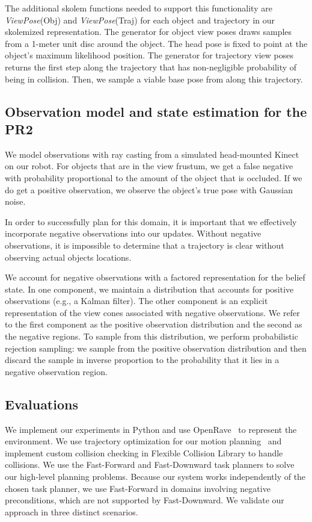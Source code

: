The additional skolem functions needed to support this functionality
are \emph{ViewPose}(Obj) and \emph{ViewPose}(Traj) for each object and
trajectory in our skolemized representation. The generator for object
view poses draws samples from a 1-meter unit disc around the
object. The head pose is fixed to point at the object's maximum
likelihood position. The generator for trajectory view poses returns
the first step along the trajectory that has non-negligible probability of being
in collision. Then, we sample a viable base pose from along this trajectory.

\subsection{Observation model and state estimation for the PR2}
We model observations with ray casting from a simulated head-mounted
Kinect on our robot. For objects that are in the view
frustum, we get a false negative with probability proportional to the
amount of the object that is occluded. If we do get a positive
observation, we observe the object's true pose with Gaussian noise.


In order to successfully plan for this domain, it is important that we
effectively incorporate negative observations into our
updates. Without negative observations, it is impossible to determine
that a trajectory is clear without observing actual objects
locations. 

We account for negative observations with a factored representation for
the belief state. In one component, we maintain a distribution that
accounts for positive observations (e.g., a Kalman filter). The other component is an explicit
representation of the view cones associated with negative
observations. We refer to the first component as the positive
observation distribution and the second as the negative regions. To
sample from this distribution, we perform probabilistic rejection sampling:
we sample from the positive observation distribution and then discard
the sample in inverse proportion to the probability that it lies in a
negative observation region.


\subsection{Evaluations}
We implement our experiments in Python and use
OpenRave~\cite{Diankov_2008_6117} to represent the environment. We use
trajectory optimization for our motion planning~\cite{schulman2013finding}
and implement custom collision checking in Flexible Collision Library to handle
collisions. We use the Fast-Forward and Fast-Downward
task planners to solve our high-level planning problems. Because our system works
independently of the chosen task planner, we use Fast-Forward in domains involving negative
preconditions, which are not supported by Fast-Downward. We validate our approach in three
distinct scenarios.

